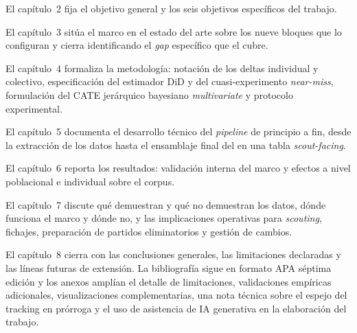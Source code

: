 El capítulo~2 fija el objetivo general y los seis objetivos específicos
del trabajo.

El capítulo~3 sitúa el marco en el estado del arte sobre los nueve
bloques que lo configuran y cierra identificando el \emph{gap}
específico que el \CCV cubre.

El capítulo~4 formaliza la metodología: notación de los deltas
individual y colectivo, especificación del estimador DiD y del
cuasi-experimento \emph{near-miss}, formulación del CATE jerárquico
bayesiano \textit{multivariate} y protocolo experimental.

El capítulo~5 documenta el desarrollo técnico del \textit{pipeline}
de principio a fin, desde la extracción de los datos hasta el
ensamblaje final del \CCV en una tabla \textit{scout-facing}.

El capítulo~6 reporta los resultados: validación interna del marco
y efectos a nivel poblacional e individual sobre el corpus.

El capítulo~7 discute qué demuestran y qué no demuestran los datos,
dónde funciona el marco y dónde no, y las implicaciones operativas
para \textit{scouting}, fichajes, preparación de partidos
eliminatorios y gestión de cambios.

El capítulo~8 cierra con las conclusiones generales, las limitaciones
declaradas y las líneas futuras de extensión. La bibliografía sigue
en formato APA séptima edición y los anexos amplían el detalle de
limitaciones, validaciones empíricas adicionales, visualizaciones
complementarias, una nota técnica sobre el espejo del tracking en
prórroga y el uso de asistencia de IA generativa en la elaboración
del trabajo.
